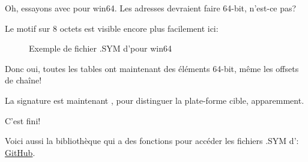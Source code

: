 \clearpage
Oh, essayons avec \oracle pour win64.
Les adresses devraient faire 64-bit, n'est-ce pas?

Le motif sur 8 octets est visible encore plus facilement ici:

\begin{figure}[H]
\centering
{}
\caption{Exemple de fichier .SYM d'\oracle pour win64}
\label{fig:oracle_SYM_whole64}
\end{figure}

Donc oui, toutes les tables ont maintenant des éléments 64-bit, même les offsets
de chaîne!

La signature est maintenant , pour distinguer la plate-forme cible,
apparemment.

C'est fini!

Voici aussi la bibliothèque qui a des fonctions pour accéder les fichiers .SYM
d'\oracle:
\href{https://github.com/DennisYurichev/porg/blob/master/lib/oracle_sym.c}{GitHub}.
